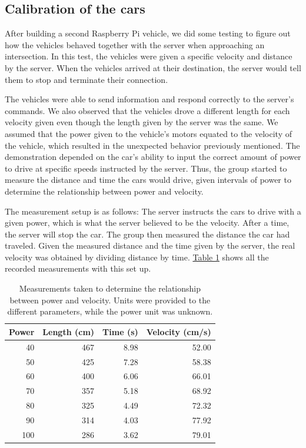 \subsection{Calibration of the cars}
After building a second Raspberry Pi vehicle, we did some testing to figure out how the vehicles behaved together with the server when approaching an intersection. In this test, the vehicles were given a specific velocity and distance by the server. When the vehicles arrived at their destination, the server would tell them to stop and terminate their connection.

The vehicles were able to send information and respond correctly to the server's commands. We also observed that the vehicles drove a different length for each velocity given even though the length given by the server was the same. We assumed that the power given to the vehicle's motors equated to the velocity of the vehicle, which resulted in the unexpected behavior previously mentioned. The demonstration depended on the car's ability to input the correct amount of power to drive at specific speeds instructed by the server. Thus, the group started to measure the distance and time the cars would drive, given intervals of power to determine the relationship between power and velocity.

The measurement setup is as follows: The server instructs the cars to drive with a given power, which is what the server believed to be the velocity. After a time, the server will stop the car. The group then measured the distance the car had traveled. Given the measured distance and the time given by the server, the real velocity was obtained by dividing distance by time. \hyperref[tab:calibration]{Table \ref{tab:calibration}} shows all the recorded measurements with this set up.

\begin{table}[h!]
	\begin{center}
		\begin{tabular}{rrrr}
			\hline
			Power & Length (cm) & Time (s) & Velocity (cm/s) \\
			\hline
			40 & 467 & 8.98 & 52.00 \\
			50 & 425 & 7.28 & 58.38 \\
			60 & 400 & 6.06 & 66.01 \\
			70 & 357 & 5.18 & 68.92 \\
			80 & 325 & 4.49 & 72.32 \\
			90 & 314 & 4.03 & 77.92 \\
			100 & 286 & 3.62 & 79.01 \\
			\hline
		\end{tabular}
		\caption{Measurements taken to determine the relationship between power and velocity. Units were provided to the different parameters, while the power unit was unknown.}
		\label{tab:calibration}
	\end{center}
\end{table}

